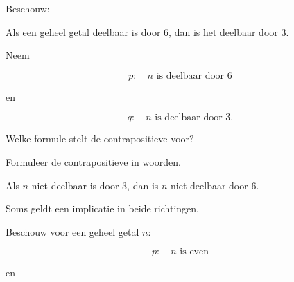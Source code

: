 \documentclass{ximera}
\begin{document}
\begin{oefening}{\oefB\ESS}

Beschouw:

\begin{center}
Als een geheel getal deelbaar is door $6$, dan is het deelbaar door $3$.
\end{center}

\begin{question}

Neem

\[
p:\quad n\text{ is deelbaar door }6
\]

en

\[
q:\quad n\text{ is deelbaar door }3.
\]

Welke formule stelt de contrapositieve voor?

\begin{multipleChoice}





\end{multipleChoice}

\end{question}

\begin{question}

Formuleer de contrapositieve in woorden.

\begin{oplossing}

Als $n$ niet deelbaar is door $3$, dan is $n$ niet deelbaar door $6$.

\end{oplossing}

\end{question}

\end{oefening}



Soms geldt een implicatie in beide richtingen.

Beschouw voor een geheel getal $n$:

\[
p:\quad n\text{ is even}
\]

en
\end{document}
